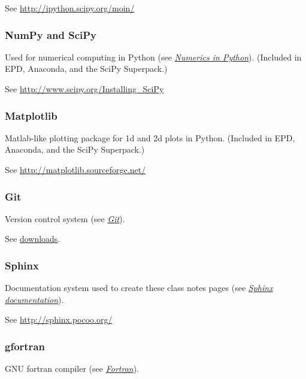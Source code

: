 \documentclass[letterpaper,10pt,english]{sphinxmanual}
\begin{document}
See \href{http://ipython.scipy.org/moin/}{http://ipython.scipy.org/moin/}


\subsubsection{NumPy and SciPy}
\label{software_installation:installing-numpy}\label{software_installation:numpy-and-scipy}
Used for numerical computing in Python (see {\hyperref[numerical_python:numerical-python]{\emph{Numerics in Python}}}).
(Included in EPD, Anaconda, and the SciPy Superpack.)

See \href{http://www.scipy.org/Installing\_SciPy}{http://www.scipy.org/Installing\_SciPy}


\subsubsection{Matplotlib}
\label{software_installation:matplotlib}
Matlab-like plotting package for 1d and 2d plots in Python.
(Included in EPD, Anaconda, and the SciPy Superpack.)

See \href{http://matplotlib.sourceforge.net/}{http://matplotlib.sourceforge.net/}


\subsubsection{Git}
\label{software_installation:git}\label{software_installation:installing-git}
Version control system (see {\hyperref[git:git]{\emph{Git}}}).

See \href{http://git-scm.com/downloads}{downloads}.


\subsubsection{Sphinx}
\label{software_installation:installing-sphinx}\label{software_installation:sphinx}
Documentation system used to create these class notes pages (see
{\hyperref[sphinx:sphinx]{\emph{Sphinx documentation}}}).

See \href{http://sphinx.pocoo.org/}{http://sphinx.pocoo.org/}


\subsubsection{gfortran}
\label{software_installation:installing-gfortran}\label{software_installation:gfortran}
GNU fortran compiler (see {\hyperref[fortran:fortran]{\emph{Fortran}}}).
\end{document}
